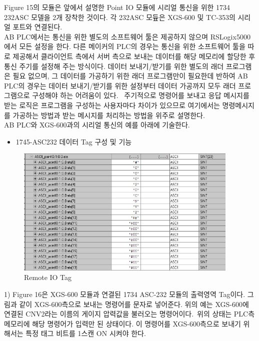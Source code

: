 \documentclass[11pt
  , a4paper
  , article
  , oneside
]{memoir}
\begin{document}
Figure 15의 모듈은 앞에서 설명한 Point IO 모듈에 시리얼 통신을 위한 1734 232ASC 모델을 2개 장착한 것이다. 각 232ASC 모듚은 XGS-600 및 TC-353의 시리얼 포트와 연결된다.\\

AB PLC에서는 통신을 위한 별도의 소프트웨어 툴은 제공하지 않으며 RSLogix5000에서 모든 설정을 한다. 다른 메이커의 PLC의 경우는 통신을 위한 소프트웨어 툴을 따로 제공해서 클라이언트 측에서 서버 측으로 보내는 데이터를 해당 메모리에 할당한 후 통신 주기를 설정해 주는 방식이다. 데이터 보내기/받기를 위한 별도의 래더 프로그램은 필요 없으며, 그 데이터를 가공하기 위한 래더 프로그램만이 필요한데 반하여 AB PLC의 경우는 데이터 보내기/받기를 위한 설정부터 데이터 가공까지 모두 래더 프로그램으로 구성해야 하는 어려움이 있다. \
주기적으로 명령어를 보내고 응답 메시지를 받는 로직은 프로그램을 구성하는 사용자마다 차이가 있으므로 여기에서는 명령메시지를 가공하는 방법과 받는 메시지를 처리하는 방법을 위주로 설명한다.\\

AB PLC와 XGS-600과의 시리얼 통신의 예를 아래에 기술한다.

\begin{itemize}
	\item 1745-ASC232 데이터 Tag 구성 및 기능
\end{itemize}
		
\begin{figure}[h]
	\centering
	\includegraphics[width=0.95\textwidth]{./picture/sending.JPG}
	\caption{Remote IO Tag}
	\label{fig:}
\end{figure}  

1) Figure 16은 XGS-600 모듈과 연결된 1734 ASC-232 모듈의 출력영역 Tag이다. 그림과 같이 XGS-600측으로 보내는 명령어를 문자로 넣어준다. 위의 예는 XGS-600에 연결된 CNV2라는 이름의 게이지 압력값을 불러오는 명령어이다.\
위의 상태는 PLC측 메모리에 해당 명령어가 입력만 된 상태이다. 이 명령어를 XGS-600측으로 보내기 위해서는 특정 태그 비트를 1스캔 ON 시켜야 한다.\\
	
\end{document}
